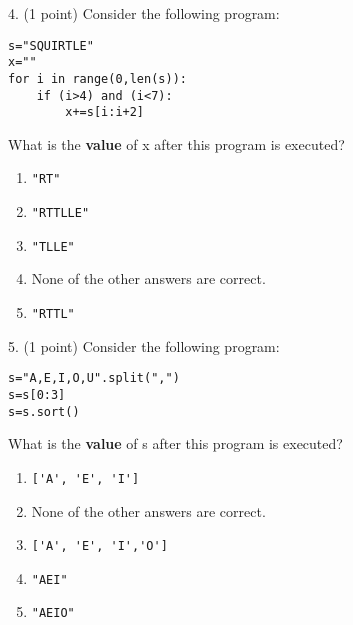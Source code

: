 \documentclass{article}
\begin{document}
\noindent
\begin{minipage}{\textwidth}
4. (1 point)
Consider the following program:
\begin{verbatim}
s="SQUIRTLE"
x=""
for i in range(0,len(s)):
    if (i>4) and (i<7):
        x+=s[i:i+2]
\end{verbatim}
What is the \textbf{value} of x after this program is executed?

\begin{enumerate}
\item[(A)]
\begin{verbatim}"RT"\end{verbatim}

\item[(B)]
\begin{verbatim}"RTTLLE"\end{verbatim}

\item[(C)]
\begin{verbatim}"TLLE"\end{verbatim}

\item[(D)]
None of the other answers are correct.

\item[(E)]
\begin{verbatim}"RTTL"\end{verbatim}

\end{enumerate}
\end{minipage}
\vspace{10em}
\filbreak\vfil{}\vfilneg

\noindent
\begin{minipage}{\textwidth}
5. (1 point)
Consider the following program:
\begin{verbatim}
s="A,E,I,O,U".split(",")
s=s[0:3]
s=s.sort()
\end{verbatim}
What is the \textbf{value} of s after this program is executed?

\begin{enumerate}
\item[(A)]
\begin{verbatim}['A', 'E', 'I']\end{verbatim}

\item[(B)]
None of the other answers are correct.

\item[(C)]
\begin{verbatim}['A', 'E', 'I','O']\end{verbatim}

\item[(D)]
\begin{verbatim}"AEI"\end{verbatim}

\item[(E)]
\begin{verbatim}"AEIO"\end{verbatim}

\end{enumerate}
\end{minipage}
\vspace{10em}
\filbreak\vfil{}\vfilneg
\end{document}
